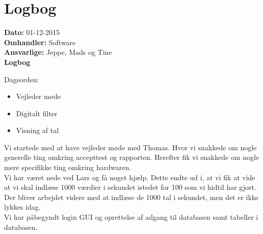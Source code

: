 \section{Logbog}

\textbf{Dato:} 01-12-2015 \\
\textbf{Omhandler:} Software \\
\textbf{Ansvarlige:} Jeppe, Mads og Tine \\
\textbf{Logbog}

Dagsorden:
\begin{itemize}
	\item Vejleder møde
	\item Digitalt filter
	\item Visning af tal
\end{itemize}


Vi startede med at have vejleder møde med Thomas. Hvor vi snakkede om nogle generelle ting omkring accepttest og rapporten. Herefter fik vi snakkede om nogle mere specifikke ting omkring hardwaren.\\
Vi har været nede ved Lars og få noget hjælp. Dette endte ud i, at vi fik at vide at vi skal indlæse 1000 værdier i sekundet istedet for 100 som vi hidtil har gjort.\\
Der bliver arbejdet videre med at indlæse de 1000 tal i sekundet, men det er ikke lykkes idag.\\
Vi har påbegyndt login GUI og oprettelse af adgang til databasen samt tabeller i databasen. 
 

